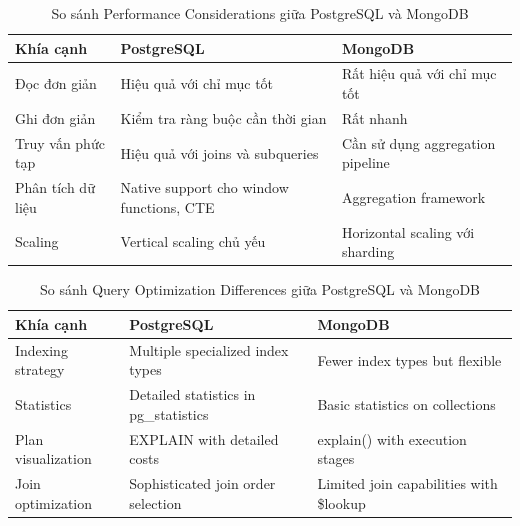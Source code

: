 \begin{table}[H]
    \centering
    \begin{tabular}{|l|l|l|}
    \hline
    Khía cạnh             & PostgreSQL                                     & MongoDB                                    \\ \hline
    Đọc đơn giản          & Hiệu quả với chỉ mục tốt                       & Rất hiệu quả với chỉ mục tốt               \\ \hline
    Ghi đơn giản          & Kiểm tra ràng buộc cần thời gian               & Rất nhanh                                  \\ \hline
    Truy vấn phức tạp     & Hiệu quả với joins và subqueries               & Cần sử dụng aggregation pipeline           \\ \hline
    Phân tích dữ liệu     & Native support cho window functions, CTE       & Aggregation framework                      \\ \hline
    Scaling               & Vertical scaling chủ yếu                        & Horizontal scaling với sharding            \\ \hline
    \end{tabular}
    \caption{So sánh Performance Considerations giữa PostgreSQL và MongoDB}
    \label{tab:comparison}
\end{table}

\begin{table}[H]
    \centering
    \begin{tabular}{|l|l|l|}
    \hline
    \textbf{Khía cạnh} & \textbf{PostgreSQL} & \textbf{MongoDB} \\ \hline
    Indexing strategy  & Multiple specialized index types & Fewer index types but flexible \\ \hline
    Statistics         & Detailed statistics in pg\_statistics & Basic statistics on collections \\ \hline
    Plan visualization & EXPLAIN with detailed costs       & explain() with execution stages \\ \hline
    Join optimization  & Sophisticated join order selection & Limited join capabilities with \$lookup \\ \hline
    \end{tabular}
    \caption{So sánh Query Optimization Differences giữa PostgreSQL và MongoDB}
    \label{tab:comparison}
\end{table}